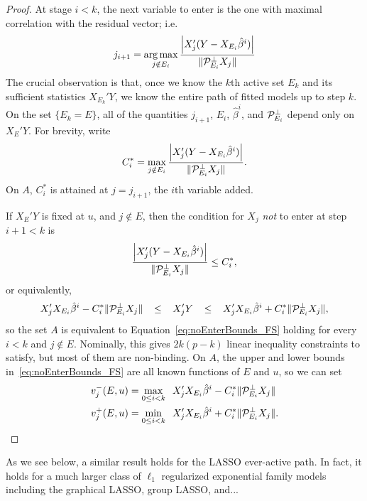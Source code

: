 \documentclass{article}
\begin{document}
\begin{proof}
  At stage $i < k$, the next variable to enter is the one with maximal correlation with the residual vector; i.e.
  \[
  j_{i+1} = \operatorname*{arg\,max}_{j \notin E_i} 
  \frac{\left| X_j ' (Y - X_{E_i}\hat\beta^i) \right|}
  {\|\mathcal{P}_{E_i}^\perp X_j\|}
  \]
  The crucial observation is that, 
  once we know the $k$th active set 
  $E_k$ and its sufficient statistics
  $X_{E_k}'Y$, we know the entire 
  path of fitted models up to step $k$.
  On the set $\{E_k=E\}$, all of the quantities 
  $j_{i+1}$, $E_i$, $\hat\beta^i$, and $\mathcal{P}_{E_i}^\perp$
  depend only on $X_E'Y$. For brevity, write
  \[
  C_i^* = \max_{j \notin E_i} 
  \frac{\left| X_j ' (Y - X_{E_i}\hat\beta^i) \right|}
  {\|\mathcal{P}_{E_i}^\perp X_j\|}.
  \]
  On $A$, $C_i^*$ is attained at $j=j_{i+1}$, the $i$th 
  variable added.

  If $X_E'Y$ is fixed at $u$, and $j \notin E$, then the condition for 
  $X_j$ {\em not} to enter at step $i+1 < k$ is
  \[
  \frac{\left| X_j' (Y - X_{E_i}\hat\beta^i) \right|}
  {\|\mathcal{P}_{E_i}^\perp X_j\|} 
  \leq C_i^*,
  \]
  or equivalently,
  \begin{equation}\label{eq:noEnterBounds_FS}
    X_j' X_{E_i}\hat\beta^i -
    C_i^*\|\mathcal{P}_{E_{i}}^\perp X_{j}\|
    \;\;\;\leq\;\;\;
    X_j'Y
    \;\;\;\leq\;\;\;
    X_j' X_{E_i}\hat\beta^i +
    C_i^*\|\mathcal{P}_{E_{i}}^\perp X_{j}\|, 
  \end{equation}
  so the set $A$ is equivalent to 
  Equation~\eqref{eq:noEnterBounds_FS} holding
  for every $i < k$ and $j \notin E$. Nominally, this gives $2k(p-k)$
  linear inequality constraints to satisfy, but most of them are
  non-binding. On $A$, the upper and lower bounds
  in~\eqref{eq:noEnterBounds_FS}
  are all known functions of $E$ and $u$, so we can set
  \begin{align}\label{eq:vMinus_FS}
    v_j^-(E,u) &= \max_{0 \leq i < k} \;\;X_j' X_{E_i}\hat\beta^i -
    C_i^*\|\mathcal{P}_{E_{i}}^\perp X_{j}\| \\
    \label{eq:vPlus_FS}
    v_j^+(E,u) &= \min_{0 \leq i < k} \;\;X_j' X_{E_i}\hat\beta^i +
    C_i^*\|\mathcal{P}_{E_{i}}^\perp X_{j}\|.
  \end{align}  
\end{proof}

As we see below, a similar result holds for the LASSO ever-active path. In fact, it holds for a much larger class of $\ell_1$ regularized exponential family models including the graphical LASSO, group LASSO, and...
\end{document}

